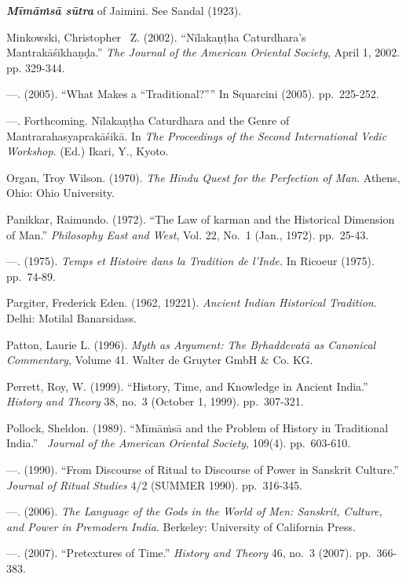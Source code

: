 \begin{thebibliography}{99}
  \textbf{\textit{Mīmāṁsā sūtra}} of Jaimini. See Sandal (1923).

  Minkowski, Christopher  Z. (2002). “Nīlakaṇṭha Caturdhara's Mantrakāśīkhaṇḍa.” \textit{The Journal of the American Oriental Society}, April 1, 2002. pp. 329-344.

  —. (2005). “What Makes a “Traditional?”” In Squarcini (2005). pp.~225-252.

  —. Forthcoming. Nīlakaṇṭha Caturdhara and the Genre of Mantrarahasyaprakāśikā. In \textit{The Proceedings of the Second International Vedic Workshop}. (Ed.) Ikari, Y., Kyoto.

  Organ, Troy Wilson. (1970). \textit{The Hindu Quest for the Perfection of Man}. Athens, Ohio: Ohio University.

  Panikkar, Raimundo. (1972). “The Law of karman and the Historical Dimension of Man.” \textit{Philosophy East and West}, Vol. 22, No.~1 (Jan., 1972). pp.~25-43.

  —. (1975). \textit{Temps et Histoire dans la Tradition de l’Inde.} In Ricoeur (1975). pp.~74-89.

  Pargiter, Frederick Eden. (1962, 19221). \textit{Ancient Indian Historical Tradition}. Delhi: Motilal Banarsidass.

  Patton, Laurie L. (1996). \textit{Myth as Argument: The Bṛhaddevatā as Canonical Commentary}, Volume 41. Walter de Gruyter GmbH \& Co. KG.

  Perrett, Roy, W. (1999). “History, Time, and Knowledge in Ancient India.” \textit{History and Theory} 38, no.~3 (October 1, 1999). pp.~307-321.

  Pollock, Sheldon. (1989). “Mīmāṁsā and the Problem of History in Traditional India.”  \textit{Journal of the American Oriental Society}, 109(4). pp.~603-610.

  —. (1990). “From Discourse of Ritual to Discourse of Power in Sanskrit Culture.” \textit{Journal of Ritual Studies} 4/2 (SUMMER 1990). pp.~316-345.

  —. (2006). \textit{The Language of the Gods in the World of Men: Sanskrit, Culture, and Power in Premodern India}. Berkeley: University of California Press.

  —. (2007). “Pretextures of Time.” \textit{History and Theory} 46, no.~3 (2007). pp.~366-383.


\end{thebibliography}
